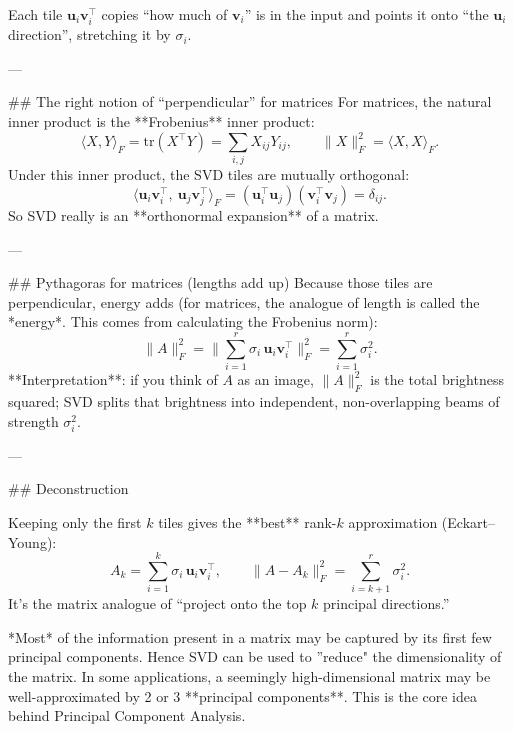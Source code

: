 Each tile $\mathbf{u}_i\mathbf{v}_i^\top$ copies “how much of $\mathbf{v}_i$” is in the input and points it onto “the $\mathbf{u}_i$ direction”, stretching it by $\sigma_i$. 

---

## The right notion of “perpendicular” for matrices
For matrices, the natural inner product is the **Frobenius** inner product:
$$
\langle X,Y\rangle_F=\mathrm{tr}(X^\top Y)=\sum_{i,j}X_{ij}Y_{ij},
\qquad
\|X\|_F^2=\langle X,X\rangle_F.
$$
Under this inner product, the SVD tiles are mutually orthogonal:
$$
\big\langle \mathbf{u}_i\mathbf{v}_i^\top,\ \mathbf{u}_j\mathbf{v}_j^\top\big\rangle_F
=(\mathbf{u}_i^\top\mathbf{u}_j)(\mathbf{v}_i^\top\mathbf{v}_j)=\delta_{ij}.
$$
So SVD really is an **orthonormal expansion** of a matrix.

---

## Pythagoras for matrices (lengths add up)
Because those tiles are perpendicular, energy adds (for matrices, the analogue of length is called the *energy*. This comes from calculating the Frobenius norm):
$$
\|A\|_F^2
=\Big\|\sum_{i=1}^r \sigma_i\,\mathbf{u}_i\mathbf{v}_i^\top\Big\|_F^2
=\sum_{i=1}^r \sigma_i^2.
$$
**Interpretation**: if you think of $A$ as an image, $\|A\|_F^2$ is the total brightness squared; SVD splits that brightness into independent, non-overlapping beams of strength $\sigma_i^2$.

---

## Deconstruction

Keeping only the first \(k\) tiles gives the **best** rank-\(k\) approximation (Eckart–Young):
$$
A_k=\sum_{i=1}^k \sigma_i\,\mathbf{u}_i\mathbf{v}_i^\top,
\qquad
\|A-A_k\|_F^2=\sum_{i=k+1}^r \sigma_i^2.
$$
It’s the matrix analogue of “project onto the top $k$ principal directions.”

*Most* of the information present in a matrix may be captured by its first few principal components. Hence SVD can be used to ''reduce" the dimensionality of the matrix. In some applications, a seemingly high-dimensional matrix may be well-approximated by 2 or 3 **principal components**. This is the core idea behind Principal Component Analysis. 


